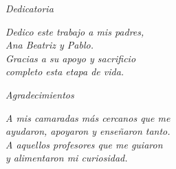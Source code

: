 \cleardoublepage
\thispagestyle{empty}

\vspace*{0.3\textheight} %

{\raggedright %
\textit{Dedicatoria} %

\vspace{2em} %

\hspace{2em} %
\begin{minipage}{0.5\textwidth} %
\raggedright %
\textit{Dedico este trabajo a mis padres, \\
Ana Beatriz y Pablo. \\
Gracias a su apoyo y sacrificio \\
completo esta etapa de vida.}
\end{minipage}
}

\cleardoublepage
\thispagestyle{empty}

\vspace*{0.3\textheight} %

{\raggedright %
\textit{Agradecimientos} %

\vspace{2em} %

\hspace{2em} %
\begin{minipage}{0.5\textwidth} %
\raggedright %
\textit{A mis camaradas más cercanos que me \\
ayudaron, apoyaron y enseñaron tanto. \\
A aquellos profesores que me guiaron \\
y alimentaron mi curiosidad.
}
\end{minipage}
}
